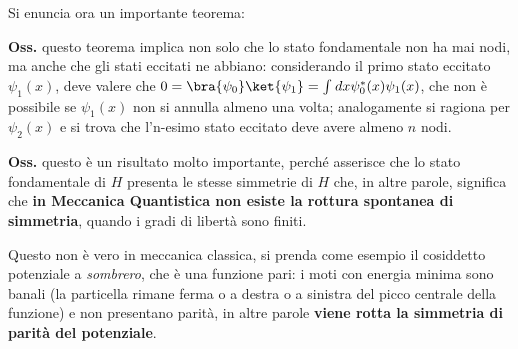 Si enuncia ora un importante teorema:

\noindent{}

\textbf{Oss.} questo teorema implica non solo che lo stato fondamentale non ha mai nodi, ma anche che gli
stati eccitati ne abbiano: considerando il primo stato eccitato $\psi_1(x)$, deve valere che 
$0 = \bra{\psi_0}\ket{\psi_1}=\int_{}^{}dx\psi^*_0(x)\psi_1(x)$, che non è possibile se $\psi_1(x)$ non
si annulla almeno una volta; analogamente si ragiona per $\psi_2(x)$ e si trova che l'n-esimo stato
eccitato deve avere almeno $n$ nodi.

\noindent{}
\newpage
\textbf{Oss.} questo è un risultato molto importante, perché asserisce che lo stato fondamentale di $H$
presenta le stesse simmetrie di $H$ che, in altre parole, significa che \textbf{in Meccanica Quantistica
non esiste la rottura spontanea di simmetria}, quando i gradi di libertà sono finiti.

Questo non è vero in meccanica classica, si prenda come esempio il cosiddetto potenziale a \textit{sombrero},
che è una funzione pari: i moti con energia minima sono banali (la particella rimane ferma o a destra
o a sinistra del picco centrale della funzione) e non presentano parità, in altre parole 
\textbf{viene rotta la simmetria di parità del potenziale}.

